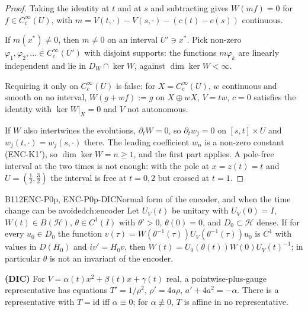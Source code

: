 \begin{proof}
Taking the identity at $t$ and at $s$ and subtracting gives $W(mf)=0$ for $f\in C_c^\infty(U)$, with $m=V(t,\cdot)-V(s,\cdot)-(c(t)-c(s))$ continuous.

If $m(x^*)\ne0$, then $m\ne0$ on an interval $U'\ni x^*$. Pick non-zero $\varphi_1,\varphi_2,\dots\in C_c^\infty(U')$ with disjoint supports: the functions $m\varphi_k$ are linearly independent and lie in $D_W\cap\ker W$, against $\dim\ker W<\infty$.

Requiring it only on $C_c^\infty(U)$ is false: for $X=C_c^\infty(U)$, $w$ continuous and smooth on no interval, $W(g+wf):=g$ on $X\oplus wX$, $V=tw$, $c=0$ satisfies the identity with $\ker W|_X=0$ and $V$ not autonomous.

If $W$ also intertwines the evolutions, $\partial_tW=0$, so $\partial_tw_j=0$ on $[s,t]\times U$ and $w_j(t,\cdot)=w_j(s,\cdot)$ there. The leading coefficient $w_n$ is a non-zero constant (ENC-K1$'$), so $\dim\ker W=n\ge1$, and the first part applies. A pole-free interval at the two times is not enough: with the pole at $x=z(t)=t$ and $U=(\frac12,\frac32)$ the interval is free at $t=0,2$ but crossed at $t=1$.

\end{proof}

\begin{dimcard}{B112}{ENC-P0p, ENC-P0p-DIC}{Normal form of the encoder, and when the time change can be avoided}{\pw}{ch:encoder}
Let $U_V(t)$ be unitary with $U_V(0)=I$, $W(t)\in B(\mathcal H)$, $\theta\in C^1(I)$ with $\theta'>0$, $\theta(0)=0$, and $D_0\subset\mathcal H$ dense. If for every $u_0\in D_0$ the function $v(\tau)=W(\theta^{-1}(\tau))U_V(\theta^{-1}(\tau))u_0$ is $C^1$ with values in $D(H_0)$ and $iv'=H_0v$, then $W(t)=U_0(\theta(t))W(0)U_V(t)^{-1}$; in particular $\theta$ is not an invariant of the encoder.

\textbf{(DIC)} For $V=\alpha(t)x^2+\beta(t)x+\gamma(t)$ real, a pointwise-plus-gauge representative has equations $T'=1/\rho^2$, $\rho'=4a\rho$, $a'+4a^2=-\alpha$. There is a representative with $T=\mathrm{id}$ iff $\alpha\equiv0$; for $\alpha\not\equiv0$, $T$ is affine in no representative.
\end{dimcard}

